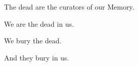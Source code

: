 \documentclass{article}
\begin{document}
\newline

The dead are the curators of our Memory.
\newline

We are the dead in us.
\newline

We bury the dead.
\newline

And they bury in us. 
\newline
\end{document}
